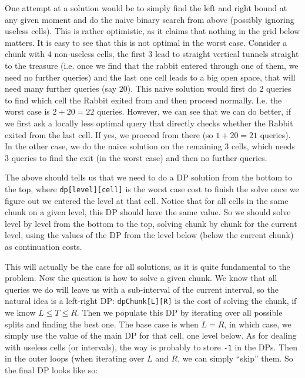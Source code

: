 \documentclass[12pt]{article}
\begin{document}
One attempt at a solution would be to simply find the left and right bound at any given moment and do the naive binary search from above (possibly ignoring useless cells). This is rather optimistic, as it claims that nothing in the grid below matters. It is easy to see that this is not optimal in the worst case. Consider a chunk with $4$ non-useless cells, the first $3$ lead to straight vertical tunnels straight to the treasure (i.e. once we find that the rabbit entered through one of them, we need no further queries) and the last one cell leads to a big open space, that will need many further queries (say $20$). This naive solution would first do $2$ queries to find which cell the Rabbit exited from and then proceed normally. I.e. the worst case is $2 + 20 = 22$ queries. However, we can see that we can do better, if we first ask a locally less optimal query that directly checks whether the Rabbit exited from the last cell. If yes, we proceed from there (so $1 + 20 = 21$ queries). In the other case, we do the naive solution on the remaining $3$ cells, which needs $3$ queries to find the exit (in the worst case) and then no further queries.

The above should tells us that we need to do a DP solution from the bottom to the top, where \verb|dp[level][cell]| is the worst case cost to finish the solve once we figure out we entered the level at that cell. Notice that for all cells in the same chunk on a given level, this DP should have the same value. So we should solve level by level from the bottom to the top, solving chunk by chunk for the current level, using the values of the DP from the level below (below the current chunk) as continuation costs.

This will actually be the case for all solutions, as it is quite fundamental to the problem. Now the question is how to solve a given chunk. We know that all queries we do will leave us with a sub-interval of the current interval, so the natural idea is a left-right DP: \verb|dpChunk[L][R]| is the cost of solving the chunk, if we know $L \leq T \leq R$. Then we populate this DP by iterating over all possible splits and finding the best one. The base case is when $L = R$, in which case, we simply use the value of the main DP for that cell, one level below. As for dealing with useless cells (or intervals), the way is probably to store \verb|-1| in the DPs. Then in the outer loops (when iterating over $L$ and $R$, we can simply ``skip'' them. So the final DP looks like so:

\vspace{1em}
\end{document}
